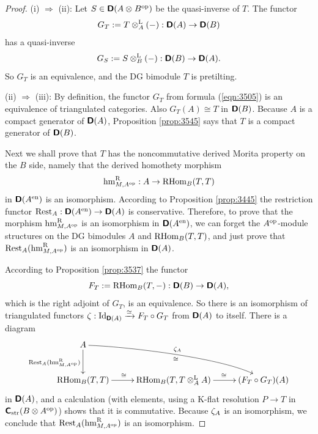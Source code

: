 \begin{proof} \mbox{} 

\smallskip \noindent
(i) $\Rightarrow$ (ii): Let $S \in \boldsymbol{\mathsf{D}}(A \otimes_{} B^{\mathrm{op}})$ be the 
quasi-inverse of $T$. The functor 
\begin{equation} \label{eqn:3505}
G_T := T \otimes^{\mathrm{L}}_{A} (-) : \boldsymbol{\mathsf{D}}(A) \to \boldsymbol{\mathsf{D}}(B)
\end{equation}
has a quasi-inverse 
\begin{equation} \label{eqn:3513}
G_S := S \otimes^{\mathrm{L}}_{B} (-) : \boldsymbol{\mathsf{D}}(B) \to \boldsymbol{\mathsf{D}}(A) . 
\end{equation}
So $G_T$ is an equivalence, and the DG bimodule $T$ is pretilting. 

\medskip \noindent
(ii) $\Rightarrow$ (iii): By definition, the functor $G_T$ 
from formula (\ref{eqn:3505}) is an equivalence of triangulated categories. 
Also $G_T(A) \cong T$ in $\boldsymbol{\mathsf{D}}(B)$. 
Because $A$ is a compact generator of $\boldsymbol{\mathsf{D}}(A)$, Proposition 
\ref{prop:3545} says that $T$ is a compact generator of $\boldsymbol{\mathsf{D}}(B)$.

Next we shall prove that $T$ has the noncommutative derived Morita property 
on the $B$ side, namely that the derived homothety morphism 
\begin{equation} \label{eqn:3511}
\operatorname{hm}^{\mathrm{R}}_{M, A^{\mathrm{op}}} : A \to \operatorname{RHom}_B(T, T) 
\end{equation}
in $\boldsymbol{\mathsf{D}}(A^{\mathrm{en}})$ is an isomorphism. 
According to Proposition \ref{prop:3445} the restriction functor
$\operatorname{Rest}_{A} : \boldsymbol{\mathsf{D}}(A^{\mathrm{en}}) \to \boldsymbol{\mathsf{D}}(A)$ 
is conservative. Therefore, to prove that the morphism 
$\operatorname{hm}^{\mathrm{R}}_{M, A^{\mathrm{op}}}$ 
is an isomorphism in $\boldsymbol{\mathsf{D}}(A^{\mathrm{en}})$, we can forget the 
$A^{\mathrm{op}}$-module structures on the DG 
bimodules $A$ and $\operatorname{RHom}_B(T, T)$, and just prove that 
$\operatorname{Rest}_{A}(\operatorname{hm}^{\mathrm{R}}_{M, A^{\mathrm{op}}})$
is an isomorphism in $\boldsymbol{\mathsf{D}}(A)$. 

According to Proposition \ref{prop:3537} the functor 
\begin{equation} \label{eqn:3506}
F_T := \operatorname{RHom}_B(T, -) : \boldsymbol{\mathsf{D}}(B) \to \boldsymbol{\mathsf{D}}(A) , 
\end{equation}
which is the right adjoint of $G_T$, is an equivalence.
So there is an isomorphism of triangulated functors
$\zeta : \operatorname{Id}_{\boldsymbol{\mathsf{D}}(A)} \xrightarrow{\simeq} F_T \circ G_T$
from $\boldsymbol{\mathsf{D}}(A)$ to itself. 
There is a diagram 
\[ \UseTips \xymatrix @C=6ex @R=6ex {
A
\ar[d]_{\opn{Rest}_{A}(\opn{hm}^{\mrm{R}}_{M, A^{\mrm{op}}}) }
\ar@(r,ul)[drr]^{\ze_A}_{\cong}
\\
\opn{RHom}_B(T, T)
\ar[r]^(0.45){\cong}
&
\opn{RHom}_B(T, T \ot^{\mrm{L}}_{A} A)
\ar[r]^(0.56){\cong}
&
(F_T \circ G_T)(A)
} \]
in $\boldsymbol{\mathsf{D}}(A)$, and a calculation (with elements, using a K-flat resolution 
$P \to T$ in $\boldsymbol{\mathsf{C}}_{\mathrm{str}}(B \otimes A^{\mathrm{op}})$) shows that it is 
commutative. Because $\zeta_A$ is an isomorphism, we conclude that 
$\operatorname{Rest}_{A}(\operatorname{hm}^{\mathrm{R}}_{M, A^{\mathrm{op}}})$ is an isomorphism. 


\end{proof}
